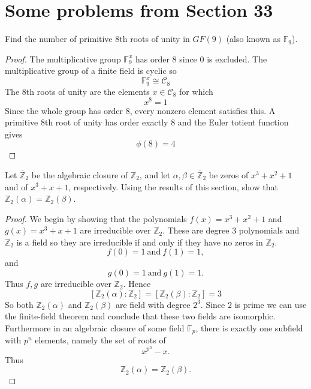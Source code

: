 \section{Some problems from Section 33}
\begin{prob}
    Find the number of primitive $8$th roots of unity 
    in $GF(9)$ (also known as $\mathbb F_9$).
\end{prob}
\begin{proof}
    The multiplicative group 
    $\mathbb F^x_9$ has order $8$ since $0$ is excluded.
    The multiplicative group of a finite field is 
    cyclic so 
    \[
        \mathbb F_9^x \cong \mathcal C_8
    \]
    The $8$th roots of unity are the elements $x \in \mathcal C_8$
    for which 
    \[
        x^8 = 1
    \]
    Since the whole group has order $8$, every nonzero element 
    satisfies this. A primitive $8$th root of unity 
    has order exactly $8$ and the Euler totient function 
    gives 
    \[
        \phi(8) = 4
    \]
\end{proof}
\begin{prob}
    Let $\overline{\mathbb Z}_2$ be the algebraic closure 
    of $\mathbb Z_2$, and let 
    $\alpha,\beta \in \overline{\mathbb Z}_2$ be zeros 
    of $x^3 + x^2 + 1$ and of $x^3 + x + 1$, respectively.
    Using the results of this section, show that 
    $\mathbb Z_2(\alpha) = \mathbb Z_2(\beta)$.
\end{prob}
\begin{proof}
    We begin by showing that the polynomials 
    $f(x) = x^3 + x^2 + 1$ and $g(x) = x^3 + x + 1$ are 
    irreducible over $\mathbb Z_2$.
    These are degree $3$ polynomials and $\mathbb Z_2$ is a field 
    so they are irreducible if and only if 
    they have no zeros in $\mathbb Z_2$.
    \[
        f(0) = 1 \ \text{and} \ f(1) = 1,
    \]
    and 
    \[
        g(0) = 1 \ \text{and} \ g(1) = 1.
    \]
    Thus $f,g$ are irreducible over $\mathbb Z_2$. 
    Hence 
    \[
        [\mathbb Z_2(\alpha) : \mathbb Z_2] 
        = 
        [\mathbb Z_2(\beta) : \mathbb Z_2] 
        = 3
    \]
    So both $\mathbb Z_2(\alpha)$ and $\mathbb Z_2(\beta)$ 
    are field with degree $2^3$. Since $2$ is prime we can 
    use the finite-field theorem and conclude that 
    these two fields are isomorphic. Furthermore 
    in an algebraic closure of some field $\mathbb F_p$, there 
    is exactly one subfield with $p^n$ elements, namely 
    the set of roots of 
    \[
        x^{p^n} - x.
    \]
    Thus 
    \[
        \mathbb Z_2(\alpha) = \mathbb Z_2(\beta).
    \]
\end{proof}

